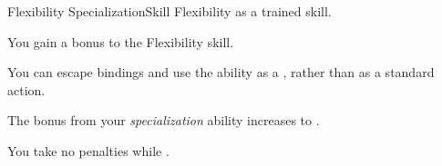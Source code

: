 
    \begin{feat}{Flexibility Specialization}{Skill}
        \featpre Flexibility as a trained skill.

         You gain a  bonus to the Flexibility skill.

         You can escape bindings and use the  ability as a , rather than as a standard action.

         The bonus from your \textit{specialization} ability increases to .

         You take no penalties while \squeezing.
    \end{feat}

